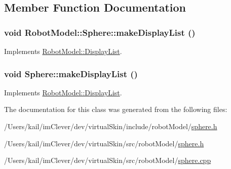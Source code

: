 \subsection{Member Function Documentation}
\hypertarget{class_robot_model_1_1_sphere_a0f338501410a9d8e220ff20ce073d244}{
\subsubsection[{makeDisplayList}]{\setlength{\rightskip}{0pt plus 5cm}void RobotModel::Sphere::makeDisplayList ()}}
\label{class_robot_model_1_1_sphere_a0f338501410a9d8e220ff20ce073d244}


Implements \hyperlink{class_robot_model_1_1_display_list_a842de97924298c7363e50aebd69e5a50}{RobotModel::DisplayList}.\hypertarget{class_robot_model_1_1_sphere_a838b5ae4f743aabe24a255dd61d2843c}{
\subsubsection[{makeDisplayList}]{\setlength{\rightskip}{0pt plus 5cm}void Sphere::makeDisplayList ()}}
\label{class_robot_model_1_1_sphere_a838b5ae4f743aabe24a255dd61d2843c}


Implements \hyperlink{class_robot_model_1_1_display_list_a842de97924298c7363e50aebd69e5a50}{RobotModel::DisplayList}.

The documentation for this class was generated from the following files:\begin{DoxyCompactItemize}
\item 
/Users/kail/imClever/dev/virtualSkin/include/robotModel/\hyperlink{include_2robot_model_2sphere_8h}{sphere.h}\item 
/Users/kail/imClever/dev/virtualSkin/src/robotModel/\hyperlink{src_2robot_model_2sphere_8h}{sphere.h}\item 
/Users/kail/imClever/dev/virtualSkin/src/robotModel/\hyperlink{sphere_8cpp}{sphere.cpp}\end{DoxyCompactItemize}
